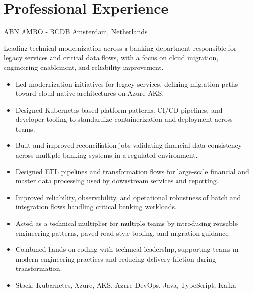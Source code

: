 \documentclass[10pt,a4paper,sans]{moderncv} %
\begin{document}
\section{Professional Experience}
{ABN AMRO - BCDB}
{Amsterdam, Netherlands}
{}{
Leading technical modernization across a banking department responsible for legacy services and critical data flows, with a focus on cloud migration, engineering enablement, and reliability improvement.
\begin{itemize}
 \item Led modernization initiatives for legacy services, defining migration paths toward cloud-native architectures on Azure AKS.
 \item Designed Kubernetes-based platform patterns, CI/CD pipelines, and developer tooling to standardize containerization and deployment across teams.
 \item Built and improved reconciliation jobs validating financial data consistency across multiple banking systems in a regulated environment.
 \item Designed ETL pipelines and transformation flows for large-scale financial and master data processing used by downstream services and reporting.
 \item Improved reliability, observability, and operational robustness of batch and integration flows handling critical banking workloads.
 \item Acted as a technical multiplier for multiple teams by introducing reusable engineering patterns, paved-road style tooling, and migration guidance.
 \item Combined hands-on coding with technical leadership, supporting teams in modern engineering practices and reducing delivery friction during transformation.
 \item Stack: Kubernetes, Azure, AKS, Azure DevOps, Java, TypeScript, Kafka
\end{itemize}
}
\end{document}

